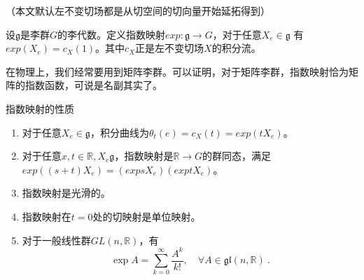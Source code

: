 
（本文默认左不变切场都是从切空间的切向量开始延拓得到）
\begin{definition}{}
设$\mathfrak g$是李群$G$的李代数。定义指数映射$exp:\mathfrak g\to G$，对于任意$X_e\in \mathfrak g$ 有$exp(X_e)=c_X(1)$。其中$c_X$正是左不变切场$X$的积分流。
\end{definition}
在物理上，我们经常要用到矩阵李群。可以证明，对于矩阵李群，指数映射恰为矩阵的指数函数，可说是名副其实了。

\begin{theorem}{指数映射的性质}
\begin{enumerate}
\item 对于任意$X_e\in \mathfrak g$，积分曲线为$\theta_t(e)=c_X(t)=exp(tX_e)$。
\item 对于任意$x,t\in\mathbb R,X_e\mathfrak g$，指数映射是$\mathbb R\to G$的群同态，满足$exp((s+t)X_e)=(expsX_e)(exptX_e)$。
\item 指数映射是光滑的。
\item 指数映射在$t=0$处的切映射是单位映射。
\item 对于一般线性群$GL(n,\mathbb R)$，有
\begin{equation}
\exp A=\sum_{k=0}^\infty\frac{A^k}{k!},\quad \forall A\in\mathfrak{gl}(n,\mathbb{R})~.
\end{equation}
\end{enumerate}
\end{theorem}

